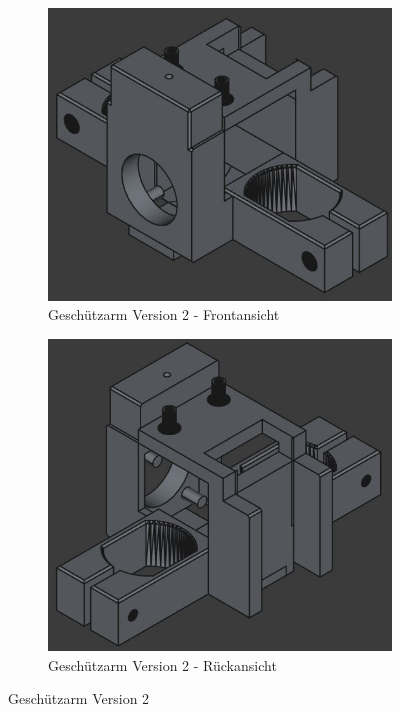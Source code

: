 \begin{figure}[h]
    \centering

    \begin{subfigure}[b]{0.45\textwidth}
        \centering
        \includegraphics[width=\textwidth]{images/cad_gunarm_v2_front.jpg}
        \caption{Geschützarm Version 2 - Frontansicht}
    \end{subfigure}
    \hfill
    \begin{subfigure}[b]{0.45\textwidth}
        \centering
        \includegraphics[width=\textwidth]{images/cad_gunarm_v2_back.jpg}
        \caption{Geschützarm Version 2 - Rückansicht}
    \end{subfigure}

    \caption{Geschützarm Version 2}
    \label{fig:gunarm_v2}
\end{figure}

